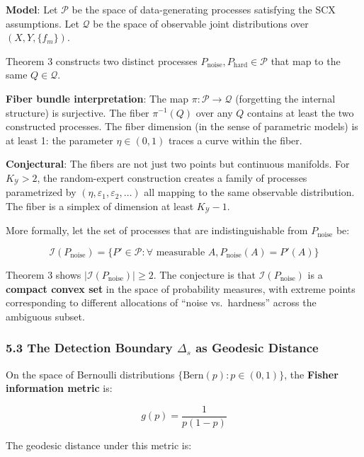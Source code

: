 \documentclass[
  12pt,
]{ctexart}
\begin{document}
\textbf{Model}: Let \(\mathcal{P}\) be the space of data-generating
processes satisfying the SCX assumptions. Let \(\mathcal{Q}\) be the
space of observable joint distributions over \((X, Y, \{f_m\})\).

Theorem 3 constructs two distinct processes
\(P_{\text{noise}}, P_{\text{hard}} \in \mathcal{P}\) that map to the
same \(Q \in \mathcal{Q}\).

\textbf{Fiber bundle interpretation}: The map
\(\pi: \mathcal{P} \to \mathcal{Q}\) (forgetting the internal structure)
is surjective. The fiber \(\pi^{-1}(Q)\) over any \(Q\) contains at
least the two constructed processes. The fiber dimension (in the sense
of parametric models) is at least 1: the parameter \(\eta \in (0, 1)\)
traces a curve within the fiber.

\textbf{Conjectural}: The fibers are not just two points but continuous
manifolds. For \(K_{\mathcal{Y}} > 2\), the random-expert construction
creates a family of processes parametrized by
\((\eta, \varepsilon_1, \varepsilon_2, \dots)\) all mapping to the same
observable distribution. The fiber is a simplex of dimension at least
\(K_{\mathcal{Y}} - 1\).

More formally, let the set of processes that are indistinguishable from
\(P_{\text{noise}}\) be:

\[\mathcal{I}(P_{\text{noise}}) = \{P' \in \mathcal{P} : \forall \text{ measurable } A, P_{\text{noise}}(A) = P'(A)\}\]

Theorem 3 shows \(|\mathcal{I}(P_{\text{noise}})| \geq 2\). The
conjecture is that \(\mathcal{I}(P_{\text{noise}})\) is a
\textbf{compact convex set} in the space of probability measures, with
extreme points corresponding to different allocations of ``noise
vs.~hardness'' across the ambiguous subset.

\subsubsection{\texorpdfstring{5.3 The Detection Boundary \(\Delta_s\)
as Geodesic
Distance}{5.3 The Detection Boundary \textbackslash Delta\_s as Geodesic Distance}}\label{the-detection-boundary-delta_s-as-geodesic-distance}

On the space of Bernoulli distributions
\(\{\text{Bern}(p) : p \in (0,1)\}\), the \textbf{Fisher information
metric} is:

\[g(p) = \frac{1}{p(1-p)}\]

The geodesic distance under this metric is:
\end{document}
